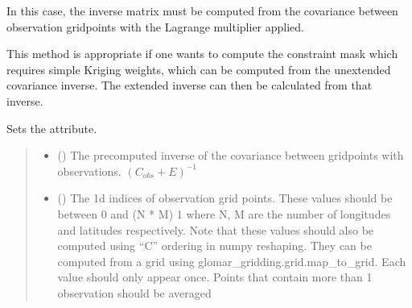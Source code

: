 \documentclass[letterpaper,10pt,english]{sphinxmanual}
\begin{document}
\begin{fulllineitems}
\begin{fulllineitems}
\sphinxAtStartPar
In this case, the inverse matrix must be computed from the covariance
between observation grid\sphinxhyphen{}points with the Lagrange multiplier applied.

\sphinxAtStartPar
This method is appropriate if one wants to compute the constraint mask
which requires simple Kriging weights, which can be computed from the
unextended covariance inverse. The extended inverse can then be
calculated from that inverse.

\sphinxAtStartPar
Sets the  attribute.
\begin{quote}\begin{description}
\begin{itemize}
\item {}
\sphinxAtStartPar
{} () \textendash{} The pre\sphinxhyphen{}computed inverse of the covariance between grid\sphinxhyphen{}points with
observations. \((C_{obs} + E)^{-1}\)

\item {}
\sphinxAtStartPar
{} (\sphinxstyleliteralemphasis{\sphinxupquote{{[}}}\sphinxstyleliteralemphasis{\sphinxupquote{{]} }}\sphinxstyleliteralemphasis{\sphinxupquote{| }}\sphinxstyleliteralemphasis{\sphinxupquote{{[}}}\sphinxstyleliteralemphasis{\sphinxupquote{{]}}}) \textendash{} The 1d indices of observation grid points. These values should be
between 0 and (N * M) \sphinxhyphen{} 1 where N, M are the number of longitudes
and latitudes respectively. Note that these values should also be
computed using “C” ordering in numpy reshaping. They can be
computed from a grid using glomar\_gridding.grid.map\_to\_grid. Each
value should only appear once. Points that contain more than 1
observation should be averaged

\end{itemize}

\sphinxAtStartPar
{}

\end{description}\end{quote}

\end{fulllineitems}


\end{fulllineitems}
\end{document}

